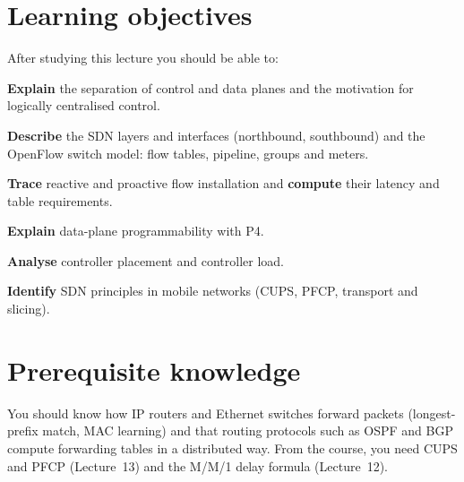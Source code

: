 \documentclass[11pt,a4paper]{article}
\begin{document}
\ACNcover

\section{Learning objectives}
After studying this lecture you should be able to:
\begin{objectives}
  \item \textbf{Explain} the separation of control and data planes and the motivation for logically
        centralised control.
  \item \textbf{Describe} the SDN layers and interfaces (northbound, southbound) and the OpenFlow
        switch model: flow tables, pipeline, groups and meters.
  \item \textbf{Trace} reactive and proactive flow installation and \textbf{compute} their latency and
        table requirements.
  \item \textbf{Explain} data-plane programmability with P4.
  \item \textbf{Analyse} controller placement and controller load.
  \item \textbf{Identify} SDN principles in mobile networks (CUPS, PFCP, transport and slicing).
\end{objectives}

\section{Prerequisite knowledge}
You should know how IP routers and Ethernet switches forward packets (longest-prefix match, MAC learning)
and that routing protocols such as OSPF and BGP compute forwarding tables in a distributed way. From the
course, you need CUPS and PFCP (Lecture~13) and the M/M/1 delay formula (Lecture~12).
\end{document}
